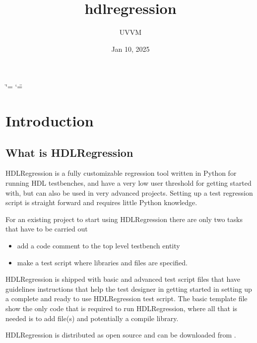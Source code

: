 \documentclass[letterpaper,10pt,english]{sphinxmanual}
\title{hdlregression}
\date{Jan 10, 2025}
\author{UVVM}
\begin{document}
\ifdefined\shorthandoff
  \ifnum\catcode`\=\string=\active\shorthandoff{=}\fi
  \ifnum\catcode`\"=\active{}\fi
\fi

\pagestyle{empty}
\sphinxmaketitle
\pagestyle{plain}
\sphinxtableofcontents
\pagestyle{normal}
\label{\detokenize{index::doc}}


\sphinxstepscope


\chapter{Introduction}
\label{\detokenize{intro:introduction}}\label{\detokenize{intro::doc}}

\section{What is HDLRegression}
\label{\detokenize{intro:what-is-hdlregression}}
\sphinxAtStartPar
HDLRegression is a fully customizable regression tool written in Python for running HDL testbenches, and have a
very low user threshold for getting started with, but can also be used in very advanced projects.
Setting up a test regression script is straight forward and requires little Python knowledge.

\sphinxAtStartPar
For an existing project to start using HDLRegression there are only two tasks that have to be carried out
\begin{itemize}
\item {} 
 \sphinxhyphen{} add a code comment to the top level testbench entity

\item {} 
 \sphinxhyphen{} make a test script where libraries and files are specified.

\end{itemize}

\sphinxAtStartPar
HDLRegression is shipped with basic and advanced test script {\hyperref[\detokenize{templates::doc}]{}} files that have guidelines instructions that help the
test designer in getting started in setting up a complete and ready to use HDLRegression test script.
The basic template file show the only code that is required to run HDLRegression, where all that is needed is to add file(s)
and potentially a compile library.

\sphinxAtStartPar
HDLRegression is distributed as open source and can be downloaded from .
\end{document}
